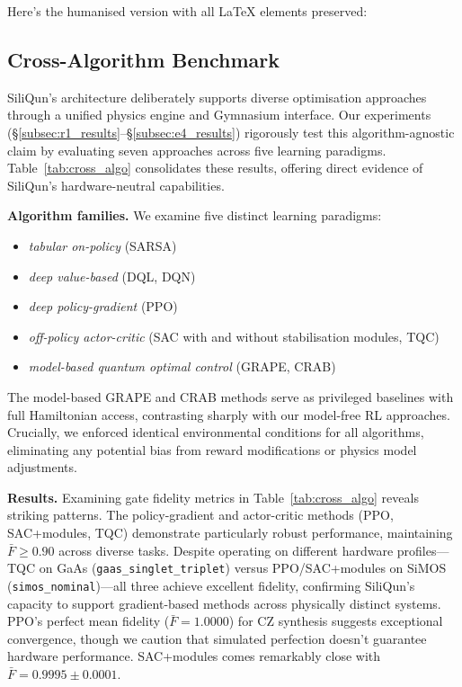 Here's the humanised version with all LaTeX elements preserved:

\subsection{Cross-Algorithm Benchmark}
\label{subsec:cross_algo}

SiliQun's architecture deliberately supports diverse optimisation approaches through a unified physics engine and Gymnasium interface. Our experiments (\S\ref{subsec:r1_results}--\S\ref{subsec:e4_results}) rigorously test this algorithm-agnostic claim by evaluating seven approaches across five learning paradigms. Table~\ref{tab:cross_algo} consolidates these results, offering direct evidence of SiliQun's hardware-neutral capabilities.

\textbf{Algorithm families.}
We examine five distinct learning paradigms:
\begin{itemize}
\item \emph{tabular on-policy} (SARSA)
\item \emph{deep value-based} (DQL, DQN)
\item \emph{deep policy-gradient} (PPO)
\item \emph{off-policy actor-critic} (SAC with and without stabilisation modules, TQC)
\item \emph{model-based quantum optimal control} (GRAPE, CRAB)
\end{itemize}
The model-based GRAPE and CRAB methods serve as privileged baselines with full Hamiltonian access, contrasting sharply with our model-free RL approaches. Crucially, we enforced identical environmental conditions for all algorithms, eliminating any potential bias from reward modifications or physics model adjustments.

\textbf{Results.}
Examining gate fidelity metrics in Table~\ref{tab:cross_algo} reveals striking patterns. The policy-gradient and actor-critic methods (PPO, SAC+modules, TQC) demonstrate particularly robust performance, maintaining $\bar{F} \geq 0.90$ across diverse tasks. Despite operating on different hardware profiles—TQC on GaAs (\texttt{gaas\_singlet\_triplet}) versus PPO/SAC+modules on SiMOS (\texttt{simos\_nominal})—all three achieve excellent fidelity, confirming SiliQun's capacity to support gradient-based methods across physically distinct systems. PPO's perfect mean fidelity ($\bar{F} = 1.0000$) for CZ synthesis suggests exceptional convergence, though we caution that simulated perfection doesn't guarantee hardware performance. SAC+modules comes remarkably close with $\bar{F} = 0.9995 \pm 0.0001$.

